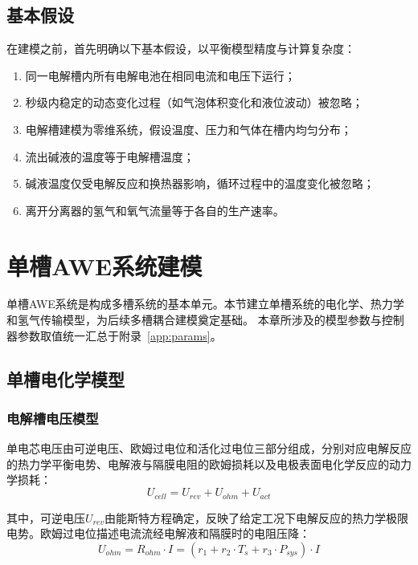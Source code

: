 \subsection{基本假设}

在建模之前，首先明确以下基本假设，以平衡模型精度与计算复杂度：

\begin{enumerate}
  \item 同一电解槽内所有电解电池在相同电流和电压下运行；
  \item 秒级内稳定的动态变化过程（如气泡体积变化和液位波动）被忽略；
  \item 电解槽建模为零维系统，假设温度、压力和气体在槽内均匀分布；
  \item 流出碱液的温度等于电解槽温度；
  \item 碱液温度仅受电解反应和换热器影响，循环过程中的温度变化被忽略；
  \item 离开分离器的氢气和氧气流量等于各自的生产速率。
\end{enumerate}

\section{单槽AWE系统建模}

单槽AWE系统是构成多槽系统的基本单元。本节建立单槽系统的电化学、热力学和氢气传输模型，为后续多槽耦合建模奠定基础。
本章所涉及的模型参数与控制器参数取值统一汇总于附录~\ref{app:params}。

\subsection{单槽电化学模型}

\subsubsection{电解槽电压模型}

单电芯电压由可逆电压、欧姆过电位和活化过电位三部分组成，分别对应电解反应的热力学平衡电势、电解液与隔膜电阻的欧姆损耗以及电极表面电化学反应的动力学损耗：
\begin{equation}
  U_{cell} = U_{rev} + U_{ohm} + U_{act}
\end{equation}

其中，可逆电压$U_{rev}$由能斯特方程确定，反映了给定工况下电解反应的热力学极限电势。欧姆过电位描述电流流经电解液和隔膜时的电阻压降：
\begin{equation}
  U_{ohm} = R_{ohm} \cdot I = (r_1 + r_2 \cdot T_s + r_3 \cdot P_{sys}) \cdot I
\end{equation}

